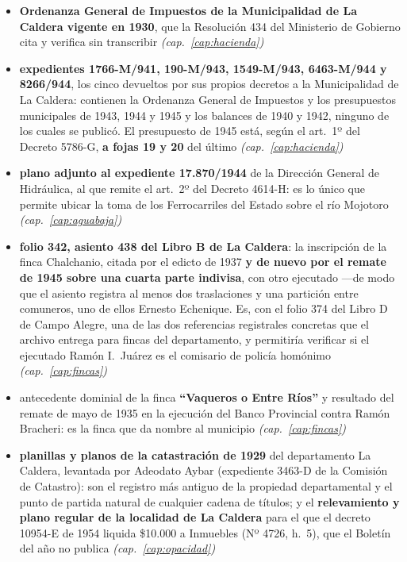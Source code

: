 \begin{itemize}[leftmargin=*]
\item \textbf{Ordenanza General de Impuestos de la Municipalidad de La Caldera vigente en 1930}, que la Resolución 434 del Ministerio de Gobierno cita y verifica sin transcribir \textit{(cap.\ \ref{cap:hacienda})}
\item \textbf{expedientes 1766-M/941, 190-M/943, 1549-M/943, 6463-M/944 y 8266/944}, los cinco devueltos por sus propios decretos a la Municipalidad de La Caldera: contienen la Ordenanza General de Impuestos y los presupuestos municipales de 1943, 1944 y 1945 y los balances de 1940 y 1942, ninguno de los cuales se publicó. El presupuesto de 1945 está, según el art.\ 1º del Decreto 5786-G, \textbf{a fojas 19 y 20} del último \textit{(cap.\ \ref{cap:hacienda})}
\item \textbf{plano adjunto al expediente 17.870/1944} de la Dirección General de Hidráulica, al que remite el art.\ 2º del Decreto 4614-H: es lo único que permite ubicar la toma de los Ferrocarriles del Estado sobre el río Mojotoro \textit{(cap.\ \ref{cap:aguabaja})}
\item \textbf{folio 342, asiento 438 del Libro B de La Caldera}: la inscripción de la finca Chalchanio, citada por el edicto de 1937 \textbf{y de nuevo por el remate de 1945 sobre una cuarta parte indivisa}, con otro ejecutado ---de modo que el asiento registra al menos dos traslaciones y una partición entre comuneros, uno de ellos Ernesto Echenique. Es, con el folio 374 del Libro D de Campo Alegre, una de las dos referencias registrales concretas que el archivo entrega para fincas del departamento, y permitiría verificar si el ejecutado Ramón I.\ Juárez es el comisario de policía homónimo \textit{(cap.\ \ref{cap:fincas})}
\item antecedente dominial de la finca \textbf{``Vaqueros o Entre Ríos''} y resultado del remate de mayo de 1935 en la ejecución del Banco Provincial contra Ramón Bracheri: es la finca que da nombre al municipio \textit{(cap.\ \ref{cap:fincas})}
\item \textbf{planillas y planos de la catastración de 1929} del departamento La Caldera, levantada por Adeodato Aybar (expediente 3463-D de la Comisión de Catastro): son el registro más antiguo de la propiedad departamental y el punto de partida natural de cualquier cadena de títulos; y el \textbf{relevamiento y plano regular de la localidad de La Caldera} para el que el decreto 10954-E de 1954 liquida \$10.000 a Inmuebles (Nº 4726, h.\ 5), que el Boletín del año no publica \textit{(cap.\ \ref{cap:opacidad})}

\end{itemize}
